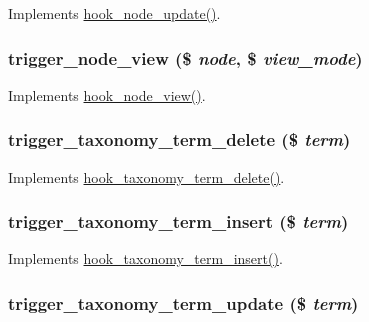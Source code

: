 \label{trigger_8module_ae3af93566b42368b4033496742b97027}
Implements \hyperlink{group__node__api__hooks_gac66c767cc922fcbfdaf17252e5d87d9d}{hook\_\-node\_\-update()}. \hypertarget{trigger_8module_acf1e3d33e0741af0dd07928dbe8b4de8}{
\subsubsection[{trigger\_\-node\_\-view}]{\setlength{\rightskip}{0pt plus 5cm}trigger\_\-node\_\-view (\$ {\em node}, \/  \$ {\em view\_\-mode})}}
\label{trigger_8module_acf1e3d33e0741af0dd07928dbe8b4de8}
Implements \hyperlink{group__node__api__hooks_ga475290ee8e81a2373ea17c512cc3f9a9}{hook\_\-node\_\-view()}. \hypertarget{trigger_8module_aadcf40cfd8517d3cc419355d46177a1d}{
\subsubsection[{trigger\_\-taxonomy\_\-term\_\-delete}]{\setlength{\rightskip}{0pt plus 5cm}trigger\_\-taxonomy\_\-term\_\-delete (\$ {\em term})}}
\label{trigger_8module_aadcf40cfd8517d3cc419355d46177a1d}
Implements \hyperlink{group__hooks_gab55fa1f290f3d43ea59795123154cf32}{hook\_\-taxonomy\_\-term\_\-delete()}. \hypertarget{trigger_8module_a2b0fedc61884a4456e603f46016d272b}{
\subsubsection[{trigger\_\-taxonomy\_\-term\_\-insert}]{\setlength{\rightskip}{0pt plus 5cm}trigger\_\-taxonomy\_\-term\_\-insert (\$ {\em term})}}
\label{trigger_8module_a2b0fedc61884a4456e603f46016d272b}
Implements \hyperlink{group__hooks_gabab3537accc8ce17fe2cd0f73f4bb817}{hook\_\-taxonomy\_\-term\_\-insert()}. \hypertarget{trigger_8module_a63ef6631e2d47302d35b0d14d880b983}{
\subsubsection[{trigger\_\-taxonomy\_\-term\_\-update}]{\setlength{\rightskip}{0pt plus 5cm}trigger\_\-taxonomy\_\-term\_\-update (\$ {\em term})}}
